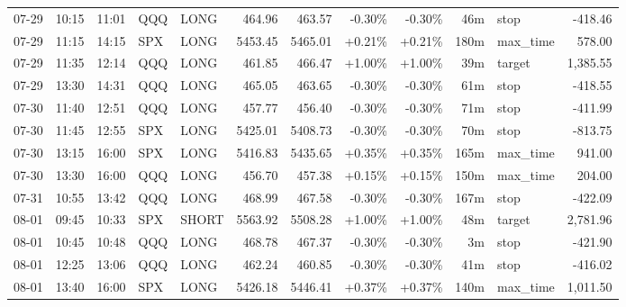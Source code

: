 \documentclass[11pt,a4paper]{article}
\begin{document}
\begin{center}
\begin{longtable}{>{\color{txtmain}}l l l l l r r r r r >{\color{txtmain}}l r}
07-29 & 10:15 & 11:01 & QQQ & LONG & 464.96 & 463.57 & \textcolor{lossred}{-0.30\%} & \textcolor{lossred}{-0.30\%} & 46m & stop & \textcolor{lossred}{-418.46} \\
07-29 & 11:15 & 14:15 & SPX & LONG & 5453.45 & 5465.01 & \textcolor{wingreen}{+0.21\%} & \textcolor{wingreen}{+0.21\%} & 180m & max\_time & \textcolor{wingreen}{578.00} \\
07-29 & 11:35 & 12:14 & QQQ & LONG & 461.85 & 466.47 & \textcolor{wingreen}{+1.00\%} & \textcolor{wingreen}{+1.00\%} & 39m & target & \textcolor{wingreen}{1,385.55} \\
07-29 & 13:30 & 14:31 & QQQ & LONG & 465.05 & 463.65 & \textcolor{lossred}{-0.30\%} & \textcolor{lossred}{-0.30\%} & 61m & stop & \textcolor{lossred}{-418.55} \\
07-30 & 11:40 & 12:51 & QQQ & LONG & 457.77 & 456.40 & \textcolor{lossred}{-0.30\%} & \textcolor{lossred}{-0.30\%} & 71m & stop & \textcolor{lossred}{-411.99} \\
07-30 & 11:45 & 12:55 & SPX & LONG & 5425.01 & 5408.73 & \textcolor{lossred}{-0.30\%} & \textcolor{lossred}{-0.30\%} & 70m & stop & \textcolor{lossred}{-813.75} \\
07-30 & 13:15 & 16:00 & SPX & LONG & 5416.83 & 5435.65 & \textcolor{wingreen}{+0.35\%} & \textcolor{wingreen}{+0.35\%} & 165m & max\_time & \textcolor{wingreen}{941.00} \\
07-30 & 13:30 & 16:00 & QQQ & LONG & 456.70 & 457.38 & \textcolor{wingreen}{+0.15\%} & \textcolor{wingreen}{+0.15\%} & 150m & max\_time & \textcolor{wingreen}{204.00} \\
07-31 & 10:55 & 13:42 & QQQ & LONG & 468.99 & 467.58 & \textcolor{lossred}{-0.30\%} & \textcolor{lossred}{-0.30\%} & 167m & stop & \textcolor{lossred}{-422.09} \\
08-01 & 09:45 & 10:33 & SPX & SHORT & 5563.92 & 5508.28 & \textcolor{wingreen}{+1.00\%} & \textcolor{wingreen}{+1.00\%} & 48m & target & \textcolor{wingreen}{2,781.96} \\
08-01 & 10:45 & 10:48 & QQQ & LONG & 468.78 & 467.37 & \textcolor{lossred}{-0.30\%} & \textcolor{lossred}{-0.30\%} & 3m & stop & \textcolor{lossred}{-421.90} \\
08-01 & 12:25 & 13:06 & QQQ & LONG & 462.24 & 460.85 & \textcolor{lossred}{-0.30\%} & \textcolor{lossred}{-0.30\%} & 41m & stop & \textcolor{lossred}{-416.02} \\
08-01 & 13:40 & 16:00 & SPX & LONG & 5426.18 & 5446.41 & \textcolor{wingreen}{+0.37\%} & \textcolor{wingreen}{+0.37\%} & 140m & max\_time & \textcolor{wingreen}{1,011.50} \\

\end{longtable}
\end{center}
\end{document}
